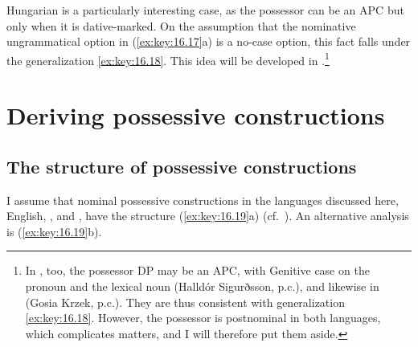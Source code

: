 \documentclass[output=paper]{langsci/langscibook}
\begin{document}
Hungarian is a particularly interesting case, as the possessor can be an
\gls{APC} but only when it is dative-marked. On the assumption that the
nominative ungrammatical option in (\ref{ex:key:16.17}a) is a no-case
option, this fact falls under the generalization \eqref{ex:key:16.18}. This idea will be
developed in .\footnote{In , too, the possessor DP
    may be an \gls{APC}, with Genitive case on the pronoun and the lexical noun
    (Halldór Sigurðsson, p.c.), and likewise in  (Gosia Krzek, p.c.).
They are thus consistent with generalization \eqref{ex:key:16.18}. However, the
possessor is postnominal in both languages, which complicates matters, and I
will therefore put them aside.}

\section{Deriving possessive constructions}\label{sec:key:16.3}

\subsection{The structure of possessive constructions}\label{sec:key:16.3.1}

I assume that nominal possessive constructions in the languages discussed here,
English, ,  and , have the structure
(\ref{ex:key:16.19}a) (cf.\
\citealt{Cardinaletti1998,Delsing1998,Julien2005,AleHaeSta2007}). An
alternative analysis is (\ref{ex:key:16.19}b).

\ea\label{ex:key:16.19}
    \ea
    \ex
    \z
\z
\end{document}
